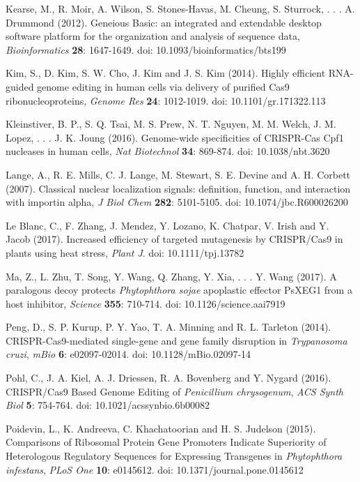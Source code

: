 \documentclass[onecolumn, 11pt,openany]{memoir}
\begin{document}
\begin{multicols}{2}
\begin{sloppy}
\begin{footnotesize}
Kearse, M., R. Moir, A. Wilson, S. Stones-Havas, M. Cheung, S. Sturrock, . . . A. Drummond (2012). Geneious Basic: an integrated and extendable desktop software platform for the organization and analysis of sequence data, \textit{Bioinformatics} \textbf{28}: 1647-1649. doi: 10.1093/bioinformatics/bts199

Kim, S., D. Kim, S. W. Cho, J. Kim and J. S. Kim (2014). Highly efficient RNA-guided genome editing in human cells via delivery of purified Cas9 ribonucleoproteins, \textit{Genome Res} \textbf{24}: 1012-1019. doi: 10.1101/gr.171322.113

Kleinstiver, B. P., S. Q. Tsai, M. S. Prew, N. T. Nguyen, M. M. Welch, J. M. Lopez, . . . J. K. Joung (2016). Genome-wide specificities of CRISPR-Cas Cpf1 nucleases in human cells, \textit{Nat Biotechnol} \textbf{34}: 869-874. doi: 10.1038/nbt.3620

Lange, A., R. E. Mills, C. J. Lange, M. Stewart, S. E. Devine and A. H. Corbett (2007). Classical nuclear localization signals: definition, function, and interaction with importin alpha, \textit{J Biol Chem} \textbf{282}: 5101-5105. doi: 10.1074/jbc.R600026200

Le Blanc, C., F. Zhang, J. Mendez, Y. Lozano, K. Chatpar, V. Irish and Y. Jacob (2017). Increased efficiency of targeted mutagenesis by CRISPR/Cas9 in plants using heat stress, \textit{Plant J}. doi: 10.1111/tpj.13782

Ma, Z., L. Zhu, T. Song, Y. Wang, Q. Zhang, Y. Xia, . . . Y. Wang (2017). A paralogous decoy protects \textit{Phytophthora sojae} apoplastic effector PsXEG1 from a host inhibitor, \textit{Science} \textbf{355}: 710-714. doi: 10.1126/science.aai7919

Peng, D., S. P. Kurup, P. Y. Yao, T. A. Minning and R. L. Tarleton (2014). CRISPR-Cas9-mediated single-gene and gene family disruption in \textit{Trypanosoma cruzi}, \textit{mBio} \textbf{6}: e02097-02014. doi: 10.1128/mBio.02097-14

Pohl, C., J. A. Kiel, A. J. Driessen, R. A. Bovenberg and Y. Nygard (2016). CRISPR/Cas9 Based Genome Editing of \textit{Penicillium chrysogenum}, \textit{ACS Synth Biol} \textbf{5}: 754-764. doi: 10.1021/acssynbio.6b00082

Poidevin, L., K. Andreeva, C. Khachatoorian and H. S. Judelson (2015). Comparisons of Ribosomal Protein Gene Promoters Indicate Superiority of Heterologous Regulatory Sequences for Expressing Transgenes in \textit{Phytophthora infestans}, \textit{PLoS One} \textbf{10}: e0145612. doi: 10.1371/journal.pone.0145612


\end{footnotesize}
\end{sloppy}
\end{multicols}
\end{document}
